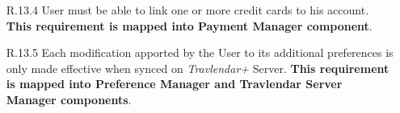 \begin{description}
\begin{itemize}
			\item[R.13.4] User must be able to link one or more credit cards to his account.
			\textbf{This requirement is mapped into Payment Manager component}.

			\item[R.13.5] Each modification apported by the User to its additional preferences is only made effective when synced on \textit{Travlendar+} Server.
			\textbf{This requirement is mapped into Preference Manager and Travlendar Server Manager components}.
		\end{itemize}
\end{description}